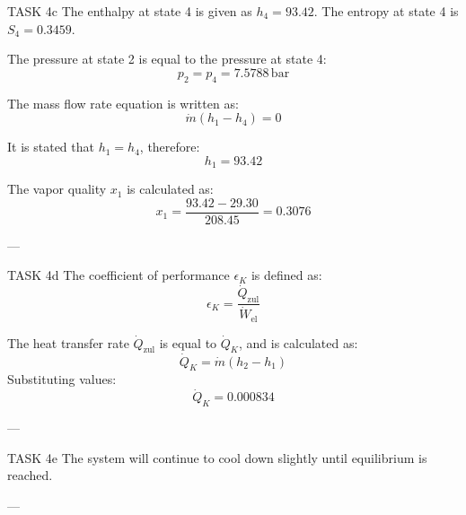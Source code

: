 TASK 4c  
The enthalpy at state 4 is given as \( h_4 = 93.42 \). The entropy at state 4 is \( S_4 = 0.3459 \).  

The pressure at state 2 is equal to the pressure at state 4:  
\[
p_2 = p_4 = 7.5788 \, \text{bar}
\]  

The mass flow rate equation is written as:  
\[
\dot{m}(h_1 - h_4) = 0
\]  

It is stated that \( h_1 = h_4 \), therefore:  
\[
h_1 = 93.42
\]  

The vapor quality \( x_1 \) is calculated as:  
\[
x_1 = \frac{93.42 - 29.30}{208.45} = 0.3076
\]  

---

TASK 4d  
The coefficient of performance \( \epsilon_K \) is defined as:  
\[
\epsilon_K = \frac{\dot{Q}_{\text{zul}}}{\dot{W}_{\text{el}}}
\]  

The heat transfer rate \( \dot{Q}_{\text{zul}} \) is equal to \( \dot{Q}_K \), and is calculated as:  
\[
\dot{Q}_K = \dot{m}(h_2 - h_1)
\]  
Substituting values:  
\[
\dot{Q}_K = 0.000834
\]  

---

TASK 4e  
The system will continue to cool down slightly until equilibrium is reached.  

---